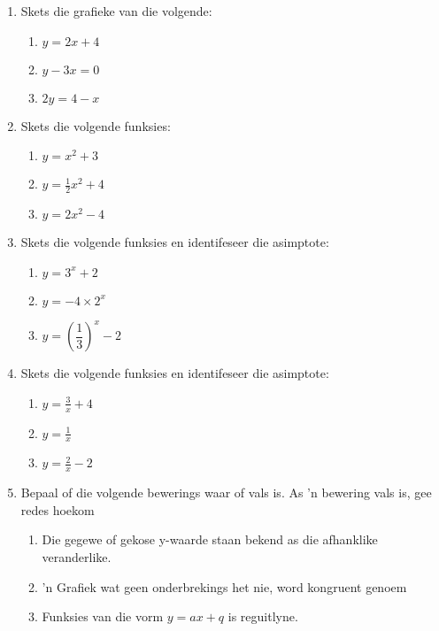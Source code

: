 \begin{eocexercises}{}
\nopagebreak
\begin{enumerate}[noitemsep, label=\textbf{\arabic*}. ] 
\item Skets die grafieke van die volgende: 
    \begin{enumerate}[noitemsep, label=\textbf{(\alph*)} ]
    \item $y=2x+4$ 
    \item $y-3x=0$ 
    \item $2y=4-x$
    \end{enumerate}
\item Skets die volgende funksies: 
    \begin{enumerate}[noitemsep, label=\textbf{(\alph*)} ] %
    \item $y=x^{2}+3$ 
    \item $y=\frac{1}{2}x^{2}+4$
    \item $y=2x^{2}-4$
    \end{enumerate}
\item Skets die volgende funksies en identifeseer die asimptote: 
    \begin{enumerate}[noitemsep, label=\textbf{(\alph*)} ]  %
    \item $y=3^{x}+2$ 
    \item $y=-4 \times 2^{x}$ 
    \item $y=\left(\dfrac{1}{3}\right)^{x}-2$ 
    \end{enumerate}
\item Skets die volgende funksies en identifeseer die asimptote: 
    \begin{enumerate}[noitemsep, label=\textbf{(\alph*)} ] %
    \item $y=\frac{3}{x}+4$ 
    \item $y=\frac{1}{x}$ 
    \item $y=\frac{2}{x}-2$ 
    \end{enumerate}
\item Bepaal of die volgende bewerings waar of vals is. As 'n bewering vals is, gee redes hoekom
    \begin{enumerate}[noitemsep, label=\textbf{(\alph*)} ]
    \item  Die gegewe of gekose y-waarde staan bekend as die afhanklike veranderlike.
    \item 'n Grafiek wat geen onderbrekings het nie, word kongruent genoem
    \item Funksies van die vorm $y=ax+q$ is reguitlyne.

\end{enumerate}
\end{enumerate}
\end{eocexercises}
